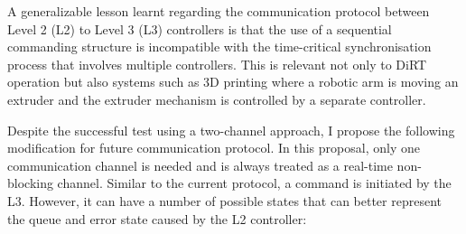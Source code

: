 
A generalizable lesson learnt regarding the communication protocol between Level 2 (L2) to Level 3 (L3) controllers is that the use of a sequential commanding structure is incompatible with the time-critical synchronisation process that involves multiple controllers. This is relevant not only to DiRT operation but also systems such as 3D printing where a robotic arm is moving an extruder and the extruder mechanism is controlled by a separate controller.

Despite the successful test using a two-channel approach, I propose the following modification for future communication protocol. In this proposal, only one communication channel is needed and is always treated as a real-time non-blocking channel. Similar to the current protocol, a command is initiated by the L3. However, it can have a number of possible states that can better represent the queue and error state caused by the L2 controller:

